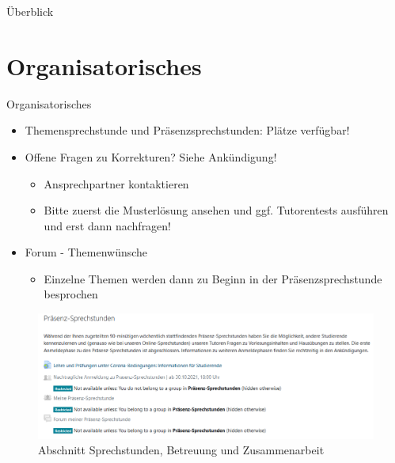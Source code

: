 \documentclass{../tuda-beamer}
\date{03. November 2021}
\begin{document}
  \maketitle

  \begin{frame}{Überblick}
    \tableofcontents
  \end{frame}


  \section{Organisatorisches}
  \begin{frame}{Organisatorisches}
    \begin{itemize}
      \item Themensprechstunde und Präsenzsprechstunden: Plätze verfügbar!
      \item Offene Fragen zu Korrekturen? Siehe Ankündigung!
      \begin{itemize}
        \item Ansprechpartner kontaktieren
        \item Bitte zuerst die Musterlösung ansehen und ggf. Tutorentests ausführen und erst dann
        nachfragen!
      \end{itemize}
      \item Forum - Themenwünsche
      \begin{itemize}
        \item Einzelne Themen werden dann zu Beginn in der Präsenzsprechstunde besprochen
      \end{itemize}
    \end{itemize}
  \end{frame}

  \begin{frame}[c]
    \begin{figure}[h]
      \centering
      \includegraphics[width=\linewidth]{graphics/pss_forum.png}
      \caption{Abschnitt Sprechstunden, Betreuung und Zusammenarbeit}
    \end{figure}
  \end{frame}
\end{document}
